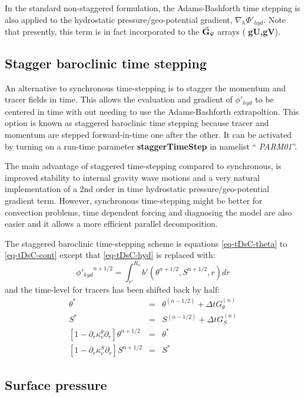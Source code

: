 In the standard non-staggered formulation, the Adams-Bashforth time
stepping is also applied to the hydrostatic pressure/geo-potential
gradient, $\nabla_h \Phi'_{hyd}$.  Note that presently, this term is in
fact incorporated to the $\vec{\bf G}_{\vec{\bf v}}$ arrays ({\bf
gU,gV}).


\subsection{Stagger baroclinic time stepping}

An alternative to synchronous time-stepping is to stagger the momentum
and tracer fields in time. This allows the evaluation and gradient of
$\phi'_{hyd}$ to be centered in time with out needing to use the
Adams-Bashforth extrapoltion. This option is known as staggered
baroclinic time stepping because tracer and momentum are stepped
forward-in-time one after the other.  It can be activated by turning
on a run-time parameter {\bf staggerTimeStep} in namelist ``{\it
PARM01}''.

The main advantage of staggered time-stepping compared to synchronous,
is improved stability to internal gravity wave motions and a very
natural implementation of a 2nd order in time hydrostatic
pressure/geo-potential gradient term. However, synchronous
time-stepping might be better for convection problems, time dependent
forcing and diagnosing the model are also easier and it allows a more
efficient parallel decomposition.

The staggered baroclinic time-stepping scheme is equations
\ref{eq-tDsC-theta} to \ref{eq-tDsC-cont} except that \ref{eq-tDsC-hyd} is replaced with:
\begin{equation}
{\phi'_{hyd}}^{n+1/2} = \int_{r'}^{R_o} b'(\theta^{n+1/2},S^{n+1/2},r)
dr
\end{equation}
and the time-level for tracers has been shifted back by half:
\begin{eqnarray*}
\theta^* & = &
\theta ^{(n-1/2)} + \Delta t G_{\theta} ^{(n)}
\\
S^* & = &
S ^{(n-1/2)} + \Delta t G_{S} ^{(n)}
\\
\left[ 1 - \partial_r \kappa_v^\theta \partial_r \right]
\theta^{n+1/2} & = & \theta^*
\\
\left[ 1 - \partial_r \kappa_v^S \partial_r \right]
S^{n+1/2} & = & S^*
\end{eqnarray*}


\subsection{Surface pressure}

